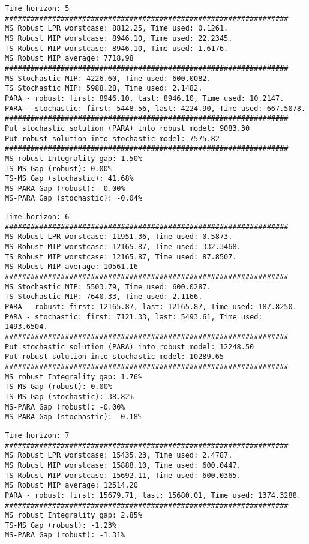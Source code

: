 \documentclass[10pt]{article}
\theoremstyle{plain}
\theoremstyle{definition}
\theoremstyle{remark}
\begin{document}
\vskip 0.5cm
\noindent
\begin{minipage}[t]{9cm}
\scriptsize
\begin{verbatim}
Time horizon: 5
##################################################################
MS Robust LPR worstcase: 8812.25, Time used: 0.1261.
MS Robust MIP worstcase: 8946.10, Time used: 22.2345.
TS Robust MIP worstcase: 8946.10, Time used: 1.6176.
MS Robust MIP average: 7718.98
##################################################################
MS Stochastic MIP: 4226.60, Time used: 600.0082.
TS Stochastic MIP: 5988.28, Time used: 2.1482.
PARA - robust: first: 8946.10, last: 8946.10, Time used: 10.2147.
PARA - stochastic: first: 5448.56, last: 4224.90, Time used: 667.5078.
##################################################################
Put stochastic solution (PARA) into robust model: 9083.30
Put robust solution into stochastic model: 7575.82
##################################################################
MS robust Integrality gap: 1.50%
TS-MS Gap (robust): 0.00%
TS-MS Gap (stochastic): 41.68%
MS-PARA Gap (robust): -0.00%
MS-PARA Gap (stochastic): -0.04%
\end{verbatim}
\end{minipage}
\begin{minipage}[t]{9cm}
\scriptsize
\begin{verbatim}
Time horizon: 6
##################################################################
MS Robust LPR worstcase: 11951.36, Time used: 0.5873.
MS Robust MIP worstcase: 12165.87, Time used: 332.3468.
TS Robust MIP worstcase: 12165.87, Time used: 87.8507.
MS Robust MIP average: 10561.16
##################################################################
MS Stochastic MIP: 5503.79, Time used: 600.0287.
TS Stochastic MIP: 7640.33, Time used: 2.1166.
PARA - robust: first: 12165.87, last: 12165.87, Time used: 187.8250.
PARA - stochastic: first: 7121.33, last: 5493.61, Time used: 1493.6504.
##################################################################
Put stochastic solution (PARA) into robust model: 12248.50
Put robust solution into stochastic model: 10289.65
##################################################################
MS robust Integrality gap: 1.76%
TS-MS Gap (robust): 0.00%
TS-MS Gap (stochastic): 38.82%
MS-PARA Gap (robust): -0.00%
MS-PARA Gap (stochastic): -0.18%
\end{verbatim}
\end{minipage}
\vskip 0.5cm
\noindent
\begin{minipage}[t]{9cm}
\scriptsize
\begin{verbatim}
Time horizon: 7
##################################################################
MS Robust LPR worstcase: 15435.23, Time used: 2.4787.
MS Robust MIP worstcase: 15888.10, Time used: 600.0447.
TS Robust MIP worstcase: 15692.11, Time used: 600.0365.
MS Robust MIP average: 12514.20
PARA - robust: first: 15679.71, last: 15680.01, Time used: 1374.3288.
##################################################################
MS robust Integrality gap: 2.85%
TS-MS Gap (robust): -1.23%
MS-PARA Gap (robust): -1.31%
\end{verbatim}
\end{minipage}
\end{document}
